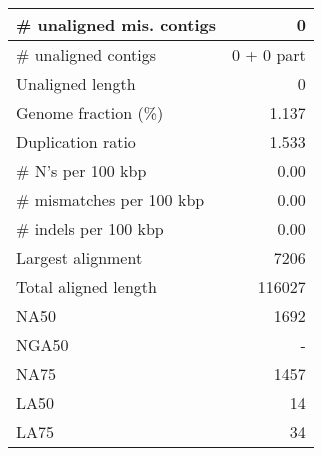 \documentclass[12pt,a4paper]{article}
\begin{document}
\begin{table}[ht]
\begin{center}
\begin{tabular}{|l*{1}{|r}|}
\# unaligned mis. contigs & 0 \\ \hline
\# unaligned contigs & 0 + 0 part \\ \hline
Unaligned length & 0 \\ \hline
Genome fraction (\%) & 1.137 \\ \hline
Duplication ratio & 1.533 \\ \hline
\# N's per 100 kbp & 0.00 \\ \hline
\# mismatches per 100 kbp & 0.00 \\ \hline
\# indels per 100 kbp & 0.00 \\ \hline
Largest alignment & 7206 \\ \hline
Total aligned length & 116027 \\ \hline
NA50 & 1692 \\ \hline
NGA50 & - \\ \hline
NA75 & 1457 \\ \hline
LA50 & 14 \\ \hline
LA75 & 34 \\ \hline
\end{tabular}
\end{center}
\end{table}
\end{document}
